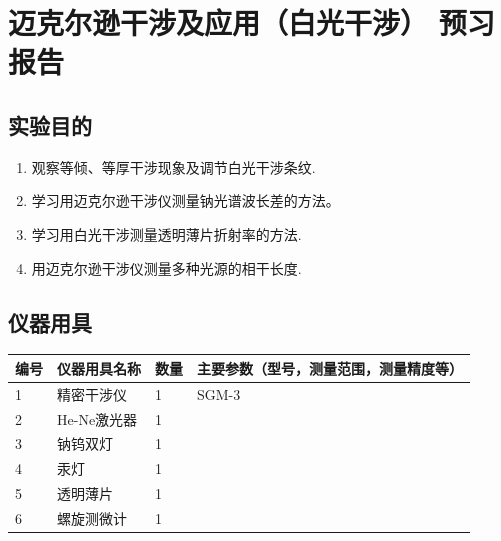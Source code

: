 \documentclass[dvipsnames, svgnames,a4paper,11pt]{article}
\begin{document}
	
	
	
	
	
	\clearpage
	\tableofcontents
	\clearpage
	
	
	
	
	\setcounter{section}{0}
	\section{迈克尔逊干涉及应用（白光干涉） \quad\heiti 预习报告}
	
	\subsection{实验目的}
	\begin{enumerate}
		\item 观察等倾、等厚干涉现象及调节白光干涉条纹.
		\item 学习用迈克尔逊干涉仪测量钠光谱波长差的方法。
		\item 学习用白光干涉测量透明薄片折射率的方法.
		\item 用迈克尔逊干涉仪测量多种光源的相干长度.
		
	\end{enumerate}
	
	\subsection{仪器用具}
	\begin{table}[htbp]
		\centering
		\renewcommand\arraystretch{1.6}
		\begin{tabular}{p{}|p{}|p{}|p{}}
		
			\hline
			编号& 仪器用具名称 & 数量 &  主要参数（型号，测量范围，测量精度等） \\
			\hline
			1& 精密干涉仪 & 1 & SGM-3 \\
			
				2& He-Ne激光器 & 1 &  \\
			
				3& 钠钨双灯 & 1 &  \\
		
				4& 汞灯& 1 &  \\
			
				5& 透明薄片  & 1 &  \\
		
				6& 螺旋测微计  & 1 &  \\
			\hline
		
		\end{tabular}
	\end{table}
	
\end{document}
